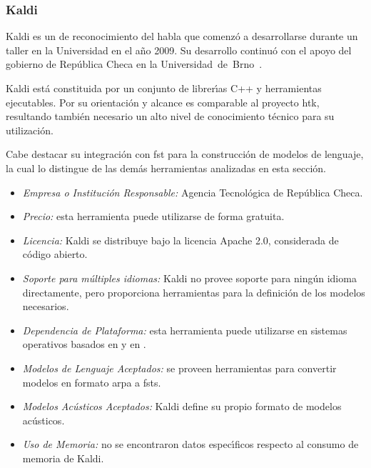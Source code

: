 \subsubsection{Kaldi}
\label{sec:kaldi}

Kaldi es un  de reconocimiento del habla que comenz\'o a desarrollarse durante un taller
en la Universidad  en el a\~no 2009. Su desarrollo continu\'o con el apoyo del gobierno
de Rep\'ublica Checa en la \mbox{Universidad de Brno \cite{Povey_ASRU2011}}.

Kaldi est\'a constituida por un conjunto de librer{\'\i}as C++ y herramientas ejecutables. Por su orientaci\'on y
alcance es comparable al proyecto \gls{htk}, resultando tambi\'en necesario un alto nivel de conocimiento t\'ecnico
para su utilizaci\'on.

Cabe destacar su integraci\'on con \gls{fst} para la
construcci\'on de modelos de lenguaje, la cual lo distingue de las dem\'as herramientas analizadas en esta secci\'on.

\begin{itemize}
	\item \emph{Empresa o Instituci\'on Responsable:} Agencia Tecnol\'ogica de Rep\'ublica Checa.
	\item \emph{Precio:} esta herramienta puede utilizarse de forma gratuita.
	\item \emph{Licencia:} Kaldi se distribuye bajo la licencia Apache 2.0, considerada de c\'odigo 
	abierto.
	\item \emph{Soporte para m\'ultiples idiomas:} Kaldi no provee soporte para ning\'un
	idioma directamente, pero proporciona herramientas para la definici\'on de los modelos 
	\mbox{necesarios.}
	\item \emph{Dependencia de Plataforma:} esta herramienta puede utilizarse en sistemas operativos
	basados en  y en .
	\item \emph{Modelos de Lenguaje Aceptados:} se proveen herramientas para convertir modelos en formato
	\gls{arpa} a \gls{fst}s.
	\item \emph{Modelos Ac\'usticos Aceptados:} Kaldi define su propio formato de modelos ac\'usticos.
	\item \emph{Uso de Memoria:} no se encontraron datos espec{\'\i}ficos respecto al consumo de memoria
	de Kaldi.
\end{itemize}